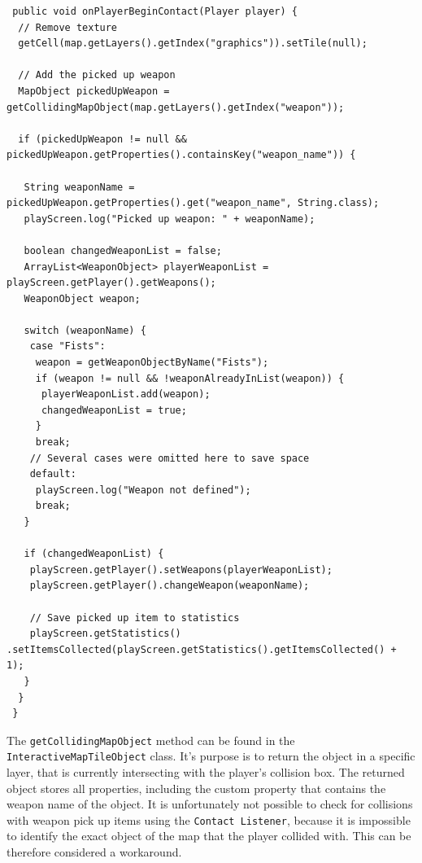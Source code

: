 \documentclass[12p]{article}
\begin{document}
\begin{verbatim}
 public void onPlayerBeginContact(Player player) {
  // Remove texture
  getCell(map.getLayers().getIndex("graphics")).setTile(null);

  // Add the picked up weapon
  MapObject pickedUpWeapon = getCollidingMapObject(map.getLayers().getIndex("weapon"));
  
  if (pickedUpWeapon != null && pickedUpWeapon.getProperties().containsKey("weapon_name")) {
  
   String weaponName = pickedUpWeapon.getProperties().get("weapon_name", String.class);
   playScreen.log("Picked up weapon: " + weaponName);

   boolean changedWeaponList = false;
   ArrayList<WeaponObject> playerWeaponList = playScreen.getPlayer().getWeapons();
   WeaponObject weapon;
   
   switch (weaponName) {
    case "Fists":
     weapon = getWeaponObjectByName("Fists");
     if (weapon != null && !weaponAlreadyInList(weapon)) {
      playerWeaponList.add(weapon);
      changedWeaponList = true;
     }
     break;
    // Several cases were omitted here to save space
    default:
     playScreen.log("Weapon not defined");
     break;
   }

   if (changedWeaponList) {
    playScreen.getPlayer().setWeapons(playerWeaponList);
    playScreen.getPlayer().changeWeapon(weaponName);

    // Save picked up item to statistics
    playScreen.getStatistics() .setItemsCollected(playScreen.getStatistics().getItemsCollected() + 1);
   }
  }
 }
\end{verbatim}
 
The \texttt{getCollidingMapObject} method can be found in the \texttt{InteractiveMapTileObject} class. It's purpose is to return the object in a specific layer, that is currently intersecting with the player's collision box. The returned object stores all properties, including the custom property that contains the weapon name of the object. It is unfortunately not possible to check for collisions with weapon pick up items using the \texttt{Contact Listener}, because it is impossible to identify the exact object of the map that the player collided with. This can be therefore considered a workaround.
 
\end{document}

